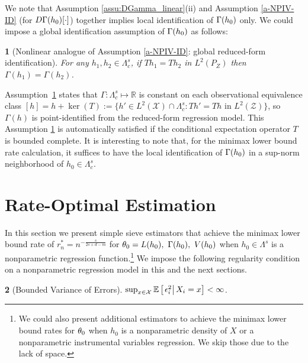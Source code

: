 \documentclass[12pt,american]{article}
\theoremstyle{definition}
\theoremstyle{plain}
\newtheorem{assumption}{\protect\assumptionname}
\theoremstyle{definition}
\theoremstyle{plain}
\theoremstyle{plain}
\theoremstyle{plain}
\theoremstyle{plain}
\theoremstyle{plain}
\newcommand{\R}{\mathbb{R}}
\newcommand{\E}{\mathbb{E}}
\providecommand{\assumptionname}{Assumption}
\providecommand{\assumptionname}{Assumption}
\begin{document}
We note that Assumption \ref{assu:DGamma_linear}(ii) and Assumption \ref{a-NPIV-ID} (for $D\Gamma(h_0)[\cdot]$) together implies local identification of $\Gamma(h_0)$ only. We could impose a global identification assumption of $\Gamma(h_0)$ as follows:
\begin{assumption}[Nonlinear analogue of Assumption \ref{a-NPIV-ID}: global reduced-form identification]
  For any $h_1,h_2\in\Lambda^s_c$, if $T h_1 = T h_2$ in $L^2(P_Z)$ then $\Gamma(h_1)=\Gamma(h_2)$.
  \label{ass:NPIV-ID-global}
\end{assumption}
Assumption~\ref{ass:NPIV-ID-global} states that $\Gamma:\Lambda^s_c \mapsto \R$ is constant on each observational equivalence class
$[h]=h+\ker(T):=\{h'\in L^2(\mathcal{X})\cap \Lambda^s_c: Th'=Th \text{ in } L^2(\mathcal{Z})\}$, so $\Gamma(h)$ is point-identified from the reduced-form regression model. This Assumption \ref{ass:NPIV-ID-global} is automatically satisfied if the conditional expectation operator $T$ is bounded complete. It is interesting to note that, for the minimax lower bound rate calculation, it suffices to have the local identification of $\Gamma(h_0)$ in a sup-norm neighborhood of $h_0\in\Lambda^s_c$.


\section{\label{sec:Minimax-UB}Rate-Optimal Estimation}

In this section we present simple sieve estimators that achieve the minimax lower bound rate of $r^*_{n}=n^{-\frac{s}{2s+d-m}}$ for $\theta_0 =L(h_0),~\Gamma(h_0),~V(h_0)$ when $h_0 \in\Lambda^s$ is a nonparametric regression function.\footnote{We could also present additional estimators to achieve the minimax lower bound rates for $\theta_0$ when $h_0$ is a nonparametric density of $X$ or a nonparametric instrumental variables regression. We skip those due to the lack of space.} We impose the following regularity condition on a nonparametric regression model in this and the next sections.

\begin{assumption}[Bounded Variance of Errors]
  \label{assu:e2_moment} $\sup_{x\in{\cal X}}\E\left[\rest{\e_{i}^{2}}X_{i}=x\right]<\infty$.
\end{assumption}
\end{document}
